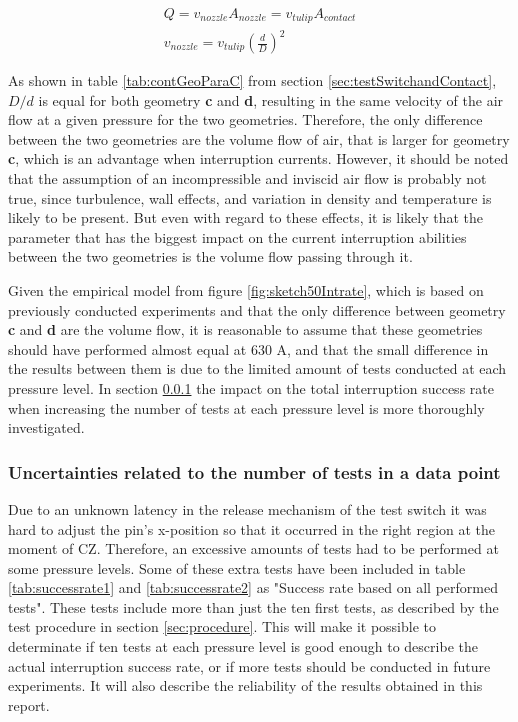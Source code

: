 \documentclass[10pt,b5paper,twoside]{article}
\begin{document}
\begin{equation} \label{nozzle_speed}
\begin{split}
Q=v_{nozzle} A_{nozzle}=v_{tulip} A_{contact} \\
v_{nozzle}=v_{tulip} \left( \frac{d}{D} \right) ^2 \ \ \ \ \ \ \ \ \
\end{split}
\end{equation} 

As shown in table \ref{tab:contGeoParaC} from section \ref{sec:testSwitchandContact}, $D/d$ is equal for both geometry \textbf{c} and \textbf{d}, resulting in the same velocity of the air flow at a given pressure for the two geometries. Therefore, the only difference between the two geometries are the volume flow of air, that is larger for geometry \textbf{c}, which is an advantage when interruption currents. However, it should be noted that the assumption of an incompressible and inviscid air flow is probably not true, since turbulence, wall effects, and variation in density and temperature is likely to be present. But even with regard to these effects, it is likely that the parameter that has the biggest impact on the current interruption abilities between the two geometries is the volume flow passing through it.

Given the empirical model from figure \ref{fig:sketch50Intrate}, which is based on previously conducted experiments and that the only difference between geometry \textbf{c} and \textbf{d} are the volume flow, it is reasonable to assume that these geometries should have performed almost equal at 630 A, and that the small difference in the results between them is due to the limited amount of tests conducted at each pressure level. In section \ref{sec:impactOfTestNumber} the impact on the total interruption success rate when increasing the number of tests at each pressure level is more thoroughly investigated.

\subsubsection{Uncertainties related to the number of tests in a data point} \label{sec:impactOfTestNumber}
Due to an unknown latency in the release mechanism of the test switch it was hard to adjust the pin's x-position so that it occurred in the right region at the moment of CZ. Therefore, an excessive amounts of tests had to be performed at some pressure levels. Some of these extra tests have been included in table \ref{tab:successrate1} and \ref{tab:successrate2} as "Success rate based on all performed tests". These tests include more than just the ten first tests, as described by the test procedure in section \ref{sec:procedure}. This will make it possible to determinate if ten tests at each pressure level is good enough to describe the actual interruption success rate, or if more tests should be conducted in future experiments. It will also describe the reliability of the results obtained in this report.
\end{document}
